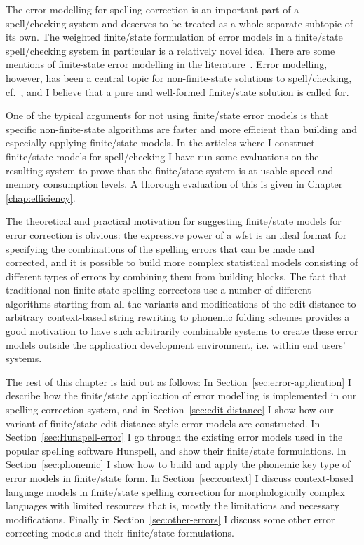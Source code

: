 \documentclass[officiallayout,final]{unihelcompling}
\begin{document}
The error modelling for spelling correction is an important part of a
spell\-/checking system and deserves to be treated as a whole separate subtopic
of its own. The weighted finite\-/state formulation of \glspl{error model} in a
finite\-/state spell\-/checking system in particular is a relatively novel
idea. There are some mentions of finite-state error modelling in the
literature~\citep{agirre1992xuxen,vannoord2001extendible,agata2002typographical,mohri2003edit}.
Error modelling, however, has been a central topic for non-finite-state
solutions to spell\-/checking,
cf.~\citet{kukich1992spelling,mitton2009ordering,deorowicz2005correcting}, and
I believe that a pure and well-formed finite\-/state solution is called for.

One of the typical arguments for not using finite\-/state error models is that
specific non-finite-state algorithms are faster and more efficient than
building and especially applying finite\-/state models. In the articles
where I construct finite\-/state models for spell\-/checking I have run some
evaluations on the resulting system to prove that the finite\-/state system is
at usable speed and memory consumption levels. A thorough evaluation of this
is given in Chapter \ref{chap:efficiency}.

The theoretical and practical motivation for suggesting finite\-/state models
for error correction is obvious: the expressive power of a \gls{wfst} is an
ideal format for specifying the combinations of the spelling errors that can be
made and corrected, and it is possible to build more complex statistical models
consisting of different types of errors by combining them from building blocks.
The fact that traditional non-finite-state spelling correctors use a number of
different algorithms starting from all the variants and modifications of the
edit distance to arbitrary context-based string rewriting to phonemic folding
schemes provides a good motivation to have such arbitrarily combinable systems
to create these error models outside the application development environment,
i.e. within end users' systems.

The rest of this chapter is laid out as follows: In
Section~\ref{sec:error-application} I describe how the finite\-/state
application of error modelling is implemented in our spelling correction
system, and in Section~\ref{sec:edit-distance} I show how our variant of
finite\-/state edit distance style error models are constructed.  In
Section~\ref{sec:Hunspell-error} I go through the existing error models used in
the popular spelling software Hunspell, and show their finite\-/state
formulations. In Section~\ref{sec:phonemic} I show how to build and apply the
phonemic key type of error models in finite\-/state form.  In
Section~\ref{sec:context} I discuss context-based language models in
finite\-/state spelling correction for morphologically complex languages with
limited resources that is, mostly the limitations and necessary modifications.
Finally in Section~\ref{sec:other-errors} I discuss some other error correcting
models and their finite\-/state formulations.
\end{document}
